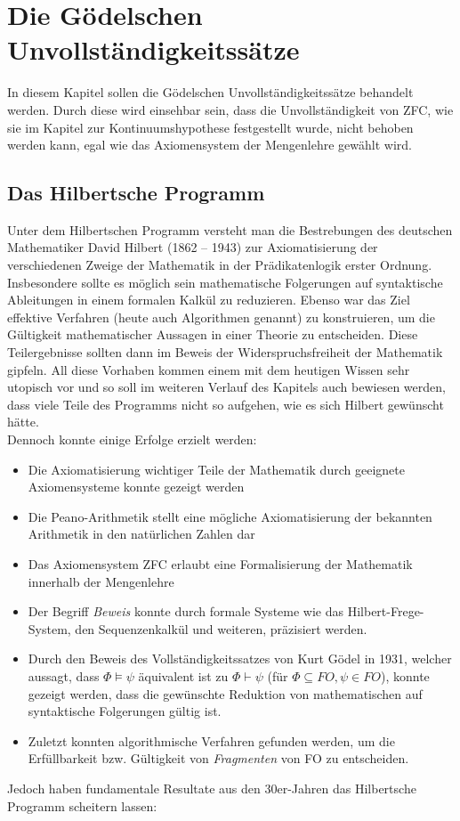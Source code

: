 \clearpage

\section{Die Gödelschen Unvollständigkeitssätze}

In diesem Kapitel sollen die Gödelschen Unvollständigkeitssätze behandelt werden. 
Durch diese wird einsehbar sein, dass die Unvollständigkeit von ZFC, wie sie im Kapitel zur Kontinuumshypothese festgestellt wurde, nicht behoben werden kann, egal wie das Axiomensystem der Mengenlehre gewählt wird.

\subsection{Das Hilbertsche Programm}

Unter dem Hilbertschen Programm versteht man die Bestrebungen des deutschen Mathematiker David Hilbert (1862 – 1943) zur Axiomatisierung der verschiedenen Zweige der Mathematik in der Prädikatenlogik erster Ordnung.
Insbesondere sollte es möglich sein mathematische Folgerungen auf syntaktische Ableitungen in einem formalen Kalkül zu reduzieren. Ebenso war das Ziel effektive Verfahren (heute auch Algorithmen genannt) zu konstruieren, um die Gültigkeit mathematischer Aussagen in einer Theorie zu entscheiden.
Diese Teilergebnisse sollten dann im Beweis der Widerspruchsfreiheit der Mathematik gipfeln. All diese Vorhaben kommen einem mit dem heutigen Wissen sehr utopisch vor und so soll im weiteren Verlauf des Kapitels auch bewiesen werden, dass viele Teile des Programms nicht so aufgehen, wie es sich Hilbert gewünscht hätte.\\
Dennoch konnte einige Erfolge erzielt werden:
\begin{itemize}
	\item Die Axiomatisierung wichtiger Teile der Mathematik durch geeignete Axiomensysteme konnte gezeigt werden
	\item Die Peano-Arithmetik stellt eine mögliche Axiomatisierung der bekannten Arithmetik in den natürlichen Zahlen dar
	\item Das Axiomensystem ZFC erlaubt eine Formalisierung der Mathematik innerhalb der Mengenlehre
	\item Der Begriff \textit{Beweis} konnte durch formale Systeme wie das Hilbert-Frege-System, den Sequenzenkalkül und weiteren, präzisiert werden.
	\item Durch den Beweis des Vollständigkeitssatzes von Kurt Gödel in 1931, welcher aussagt, dass $\Phi \models \psi$ äquivalent ist zu $\Phi \vdash \psi$ (für $\Phi\subseteq FO, \psi\in FO$), konnte gezeigt werden, dass die gewünschte Reduktion von mathematischen auf syntaktische Folgerungen gültig ist.
	\item Zuletzt konnten algorithmische Verfahren gefunden werden, um die Erfüllbarkeit bzw. Gültigkeit von \textit{Fragmenten} von FO zu entscheiden.
\end{itemize}
Jedoch haben fundamentale Resultate aus den 30er-Jahren das Hilbertsche Programm scheitern lassen:

